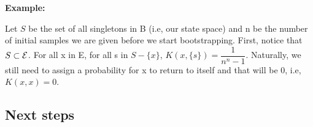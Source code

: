 \textbf{Example:}

Let $S$ be the set of all singletons in B (i.e, our state space) and n be the number of initial samples we are given before we start bootstrapping. First, notice that $S \subset \mathcal{E}$.
For all x in E, for all s in $S - \{x\}$, $K(x, \{s\}) = \dfrac{1}{n^n-1}$. Naturally, we still need to assign a probability for x to return to itself and that will be 0, i.e, $K(x,x) = 0$.



\subsection{Next steps}

